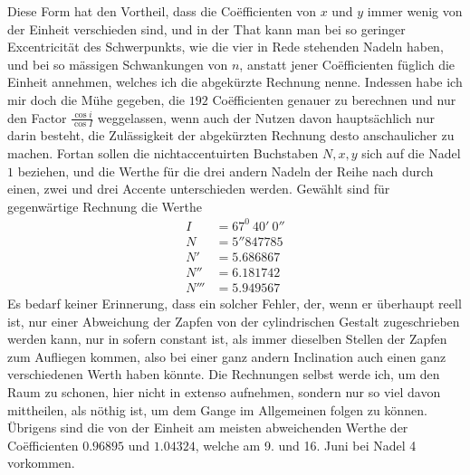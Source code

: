 Diese Form hat den Vortheil, dass die Coëfficienten von $x$ und $y$ immer wenig von der Einheit verschieden sind, und in der That kann man bei so geringer Excentricität des Schwerpunkts, wie die vier in Rede stehenden Nadeln haben, und bei so mässigen Schwankungen von $n$, anstatt jener Coëfficienten füglich die Einheit annehmen, welches ich die abgekürzte Rechnung nenne. Indessen habe ich mir doch die Mühe gegeben, die $192$ Coëfficienten genauer zu berechnen und nur den Factor $\frac{\cos i}{\cos I}$ weggelassen, wenn auch der Nutzen davon hauptsächlich nur darin besteht, die Zulässigkeit der abgekürzten Rechnung desto anschaulicher zu machen. Fortan sollen die nichtaccentuirten Buchstaben $N,x,y$ sich auf die Nadel $1$ beziehen, und die Werthe für die drei andern Nadeln der Reihe nach durch einen, zwei und drei Accente unterschieden werden. Gewählt sind für gegenwärtige Rechnung die Werthe
\[
\begin{aligned}
I&=67^0\ 40'\ 0''\\
N&=5''847785\\
N'&=5.686867\\
N''&=6.181742\\
N'''&=5.949567
\end{aligned}
\]
\expandafter\def\csname HistoricalNoteText485\endcsname{Es bedarf keiner Erinnerung, dass ein solcher Fehler, der, wenn er überhaupt reell ist, nur einer Abweichung der Zapfen von der cylindrischen Gestalt zugeschrieben werden kann, nur in sofern constant ist, als immer dieselben Stellen der Zapfen zum Aufliegen kommen, also bei einer ganz andern Inclination auch einen ganz verschiedenen Werth haben könnte.}
Die Rechnungen selbst werde ich, um den Raum zu schonen, hier nicht in extenso aufnehmen, sondern nur so viel davon mittheilen, als nöthig ist, um dem Gange im Allgemeinen folgen zu können. Übrigens sind die von der Einheit am meisten abweichenden Werthe der Coëfficienten $0.96895$ und $1.04324$, welche am 9. und 16. Juni bei Nadel 4 vorkommen.

